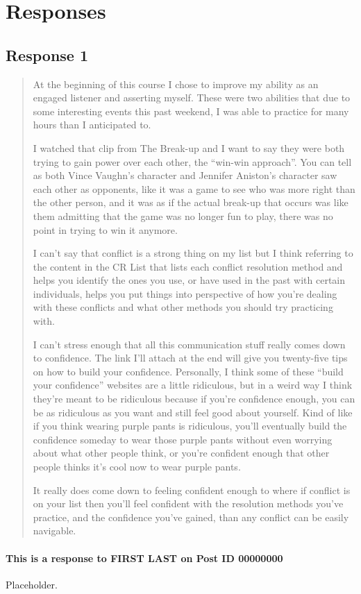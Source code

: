 
\section{Responses}
  \subsection{Response 1}
    \begin{quotation}
      At the beginning of this course I chose to improve my ability as an
        engaged listener and asserting myself. These were two abilities that due
        to some interesting events this past weekend, I was able to practice for
        many hours than I anticipated to.

      I watched that clip from The Break-up and I want to say they were both
        trying to gain power over each other, the ``win-win approach''. You can
        tell as both Vince Vaughn's character and Jennifer Aniston's character
        saw each other as opponents, like it was a game to see who was more
        right than the other person, and it was as if the actual break-up that
        occurs was like them admitting that the game was no longer fun to play,
        there was no point in trying to win it anymore.

      I can't say that conflict is a strong thing on my list but I think
        referring to the content in the CR List that lists each conflict
        resolution method and helps you identify the ones you use, or have used
        in the past with certain individuals, helps you put things into
        perspective of how you're dealing with these conflicts and what other
        methods you should try practicing with.

      I can't stress enough that all this communication stuff really comes down
        to confidence. The link I'll attach at the end will give you twenty-five
        tips on how to build your confidence. Personally, I think some of these
        ``build your confidence'' websites are a little ridiculous, but in a
        weird way I think they're meant to be ridiculous because if you're
        confidence enough, you can be as ridiculous as you want and still feel
        good about yourself. Kind of like if you think wearing purple pants is
        ridiculous, you'll eventually build the confidence someday to wear those
        purple pants without even worrying about what other people think, or
        you're confident enough that other people thinks it's cool now to wear
        purple pants.

      It really does come down to feeling confident enough to where if conflict
        is on your list then you'll feel confident with the resolution methods
        you've practice, and the confidence you've gained, than any conflict can
        be easily navigable.
    \end{quotation}

    \paragraph{This is a response to FIRST LAST on Post ID 00000000}
      Placeholder.
